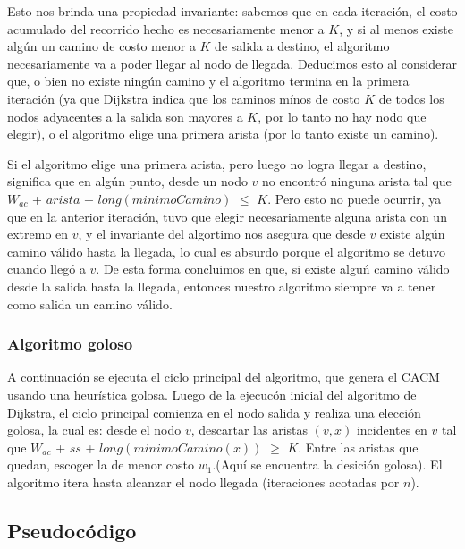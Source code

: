Esto nos brinda una propiedad invariante: sabemos que en cada iteraci\'on, el costo acumulado del recorrido hecho es necesariamente menor a $K$, y si al menos existe alg\'un un camino de costo menor a $K$ de salida a destino, el algoritmo necesariamente va a poder llegar al nodo de llegada. Deducimos esto al considerar que, o bien no existe ning\'un camino y  el algoritmo termina en la primera iteraci\'on (ya que Dijkstra indica que los caminos m\'inos de costo $K$ de todos los nodos adyacentes a la salida son mayores a $K$, por lo tanto no hay nodo que elegir), o el algoritmo elige una primera arista (por lo tanto existe un camino). 

\vspace{2mm}

Si el algoritmo elige una primera arista, pero luego no logra llegar a destino, significa que en alg\'un punto, desde un nodo $v$ no encontr\'o ninguna arista tal que $W_{ac}$ + $arista$ + $long(minimoCamino)$ $\leq$ $K$. Pero esto no puede ocurrir, ya que en la anterior iteraci\'on, tuvo que elegir necesariamente alguna arista con un extremo en $v$, y el invariante del algortimo nos asegura que desde $v$ existe alg\'un camino v\'alido hasta la llegada, lo cual es absurdo porque el algoritmo se detuvo cuando lleg\'o a $v$. De esta forma concluimos en que, si existe algu\'n camino v\'alido desde la salida hasta la llegada, entonces nuestro algoritmo siempre va a tener como salida un camino v\'alido.

\subsubsection{Algoritmo goloso}

A continuaci\'on se ejecuta el ciclo principal del algoritmo, que genera el CACM usando una heur\'istica golosa. Luego de la ejecuc\'on inicial del algoritmo de Dijkstra, el ciclo principal comienza en el nodo salida y realiza una elecci\'on golosa, la cual es: desde el nodo $v$, descartar las aristas $(v,x)$ incidentes en $v$ tal que $W_{ac}$ + $ss$ + $long(minimoCamino(x))$ $\geq$ $K$. Entre las aristas que quedan, escoger la de menor costo $w_1$.(Aqu\'i se encuentra la desici\'on golosa). El algoritmo itera hasta alcanzar el nodo llegada (iteraciones acotadas por $n$).

\subsection{Pseudoc\'odigo}


